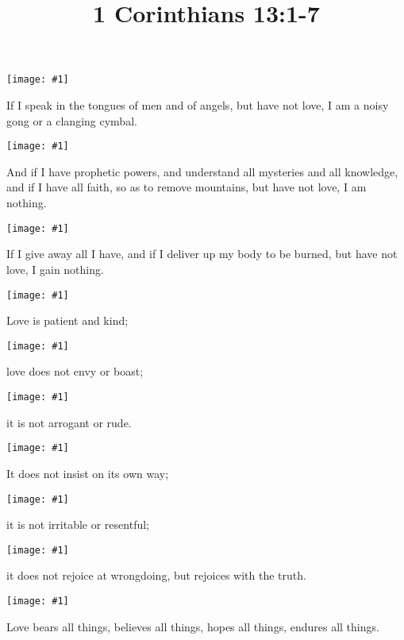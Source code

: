 \documentclass[a5paper]{book}
\title{1 Corinthians 13:1-7}
\newcommand{\V}[2]{
    \begin{centering}
    \centerline{\texttt{[image: \#1]}}
    \vfill
    \LARGE{#2}
    \end{centering}
    \newpage
}
\begin{document}
\maketitle

\V  {cymbal}
    {If I speak in the tongues of men and of angels, but have not love, I am a noisy gong or a clanging cymbal.}

\V  {book}
    {And if I have prophetic powers, and understand all mysteries and all knowledge, and if I have all faith, so as to remove mountains, but have not love, I am nothing.}

\V  {money}
    {If I give away all I have, and if I deliver up my body to be burned, but have not love, I gain nothing.}

\V  {clock}
    {Love is patient and kind;}

\V  {shout}
    {love does not envy or boast;}

\V  {shove}
    {it is not arrogant or rude.}

\V  {donkey}
    {It does not insist on its own way;}

\V  {angry}
    {it is not irritable or resentful;}

\V  {rejoice}
    {it does not rejoice at wrongdoing, but rejoices with the truth.}

\V  {heart}
    {Love bears all things, believes all things, hopes all things, endures all things.}
\end{document}
